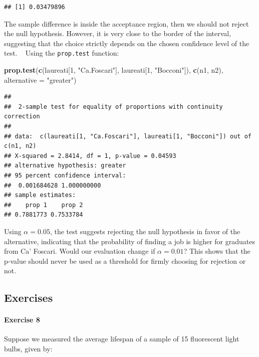 \documentclass[
]{article}
\newenvironment{Shaded}{\begin{snugshade}}{\end{snugshade}}
\newcommand{\AttributeTok}[1]{\textcolor[rgb]{0.13,0.29,0.53}{#1}}
\newcommand{\DecValTok}[1]{\textcolor[rgb]{0.00,0.00,0.81}{#1}}
\newcommand{\FunctionTok}[1]{\textcolor[rgb]{0.13,0.29,0.53}{\textbf{#1}}}
\newcommand{\NormalTok}[1]{#1}
\newcommand{\StringTok}[1]{\textcolor[rgb]{0.31,0.60,0.02}{#1}}
\begin{document}
\begin{verbatim}
## [1] 0.03479896
\end{verbatim}

The sample difference is inside the acceptance region, then we should
not reject the null hypothesis. However, it is very close to the border
of the interval, suggesting that the choice strictly depends on the
chosen confidence level of the test. ~ Using the \texttt{prop.test}
function:

\begin{Shaded}
\begin{Highlighting}[]
\FunctionTok{prop.test}\NormalTok{(}\FunctionTok{c}\NormalTok{(laureati[}\DecValTok{1}\NormalTok{, }\StringTok{"Ca.Foscari"}\NormalTok{], laureati[}\DecValTok{1}\NormalTok{, }\StringTok{"Bocconi"}\NormalTok{]),}
           \FunctionTok{c}\NormalTok{(n1, n2), }\AttributeTok{alternative =} \StringTok{"greater"}\NormalTok{)}
\end{Highlighting}
\end{Shaded}

\begin{verbatim}
## 
##  2-sample test for equality of proportions with continuity correction
## 
## data:  c(laureati[1, "Ca.Foscari"], laureati[1, "Bocconi"]) out of c(n1, n2)
## X-squared = 2.8414, df = 1, p-value = 0.04593
## alternative hypothesis: greater
## 95 percent confidence interval:
##  0.001684628 1.000000000
## sample estimates:
##    prop 1    prop 2 
## 0.7881773 0.7533784
\end{verbatim}

Using \(\alpha = 0.05\), the test suggests rejecting the null hypothesis
in favor of the alternative, indicating that the probability of finding
a job is higher for graduates from Ca' Foscari. Would our evaluation
change if \(\alpha = 0.01\)? This shows that the p-value should never be
used as a threshold for firmly choosing for rejection or not.

\hypertarget{exercises}{%
\subsection{Exercises}\label{exercises}}

\hypertarget{exercise-8}{%
\paragraph{Exercise 8}\label{exercise-8}}

Suppose we measured the average lifespan of a sample of 15 fluorescent
light bulbs, given by:
\end{document}
